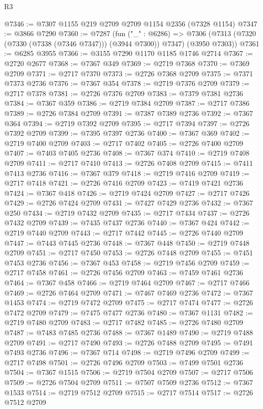 \begin{lexlean}{R3}
\begin{coremodule}
@7346 := @7307 @1155 @219 @2709 @2709 @1154 @2356 (@7328 @1154)
@7347 := @3866 @7290
@7360 := @7287
    (fun ("_" : @6286) =>
    @7306 (@7313 (@7320 (@7330 (@7338 (@7346 @7347))) (@3944 @7300)) @7347) (@3950 @7303))
@7361 := @6285 @3955
@7366 := @3155 @7290 @1170 @1185 @1746 @2714
@7367 := @2720 @2677
@7368 := @7367 @349
@7369 := @2719 @7368
@7370 := @7369 @2709
@7371 := @2717 @7370
@7373 := @2726 @7368 @2709
@7375 := @7371 @7373 @2736
@7376 := @7367 @354
@7378 := @2719 @7376 @2709
@7379 := @2717 @7378
@7381 := @2726 @7376 @2709
@7383 := @7379 @7381 @2736
@7384 := @7367 @359
@7386 := @2719 @7384 @2709
@7387 := @2717 @7386
@7389 := @2726 @7384 @2709
@7391 := @7387 @7389 @2736
@7392 := @7367 @364
@7394 := @2719 @7392 @2709
@7395 := @2717 @7394
@7397 := @2726 @7392 @2709
@7399 := @7395 @7397 @2736
@7400 := @7367 @369
@7402 := @2719 @7400 @2709
@7403 := @2717 @7402
@7405 := @2726 @7400 @2709
@7407 := @7403 @7405 @2736
@7408 := @7367 @374
@7410 := @2719 @7408 @2709
@7411 := @2717 @7410
@7413 := @2726 @7408 @2709
@7415 := @7411 @7413 @2736
@7416 := @7367 @379
@7418 := @2719 @7416 @2709
@7419 := @2717 @7418
@7421 := @2726 @7416 @2709
@7423 := @7419 @7421 @2736
@7424 := @7367 @418
@7426 := @2719 @7424 @2709
@7427 := @2717 @7426
@7429 := @2726 @7424 @2709
@7431 := @7427 @7429 @2736
@7432 := @7367 @250
@7434 := @2719 @7432 @2709
@7435 := @2717 @7434
@7437 := @2726 @7432 @2709
@7439 := @7435 @7437 @2736
@7440 := @7367 @424
@7442 := @2719 @7440 @2709
@7443 := @2717 @7442
@7445 := @2726 @7440 @2709
@7447 := @7443 @7445 @2736
@7448 := @7367 @448
@7450 := @2719 @7448 @2709
@7451 := @2717 @7450
@7453 := @2726 @7448 @2709
@7455 := @7451 @7453 @2736
@7456 := @7367 @453
@7458 := @2719 @7456 @2709
@7459 := @2717 @7458
@7461 := @2726 @7456 @2709
@7463 := @7459 @7461 @2736
@7464 := @7367 @458
@7466 := @2719 @7464 @2709
@7467 := @2717 @7466
@7469 := @2726 @7464 @2709
@7471 := @7467 @7469 @2736
@7472 := @7367 @1453
@7474 := @2719 @7472 @2709
@7475 := @2717 @7474
@7477 := @2726 @7472 @2709
@7479 := @7475 @7477 @2736
@7480 := @7367 @1131
@7482 := @2719 @7480 @2709
@7483 := @2717 @7482
@7485 := @2726 @7480 @2709
@7487 := @7483 @7485 @2736
@7488 := @7367 @1489
@7490 := @2719 @7488 @2709
@7491 := @2717 @7490
@7493 := @2726 @7488 @2709
@7495 := @7491 @7493 @2736
@7496 := @7367 @714
@7498 := @2719 @7496 @2709
@7499 := @2717 @7498
@7501 := @2726 @7496 @2709
@7503 := @7499 @7501 @2736
@7504 := @7367 @1515
@7506 := @2719 @7504 @2709
@7507 := @2717 @7506
@7509 := @2726 @7504 @2709
@7511 := @7507 @7509 @2736
@7512 := @7367 @1533
@7514 := @2719 @7512 @2709
@7515 := @2717 @7514
@7517 := @2726 @7512 @2709

\end{coremodule}
\end{lexlean}

